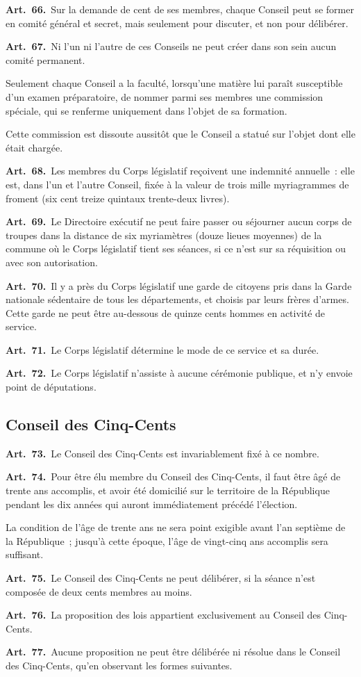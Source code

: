 \documentclass[french,twoside]{book} %
\newcommand{\labelchar}[1]{\textbf{\color{rubric} #1}}
\begin{document}
\labelchar{Art. 66.} Sur la demande de cent de ses membres, chaque Conseil peut se former en comité général et secret, mais seulement pour discuter, et non pour délibérer.\par
\labelchar{Art. 67.} Ni l’un ni l’autre de ces Conseils ne peut créer dans son sein aucun comité permanent.\par
Seulement chaque Conseil a la faculté, lorsqu’une matière lui paraît susceptible d’un examen préparatoire, de nommer parmi ses membres une commission spéciale, qui se renferme uniquement dans l’objet de sa formation.\par
Cette commission est dissoute aussitôt que le Conseil a statué sur l’objet dont elle était chargée.\par
\labelchar{Art. 68.} Les membres du Corps législatif reçoivent une indemnité annuelle : elle est, dans l’un et l’autre Conseil, fixée à la valeur de trois mille myriagrammes de froment (six cent treize quintaux trente-deux livres).\par
\labelchar{Art. 69.} Le Directoire exécutif ne peut faire passer ou séjourner aucun corps de troupes dans la distance de six myriamètres (douze lieues moyennes) de la commune où le Corps législatif tient ses séances, si ce n’est sur sa réquisition ou avec son autorisation.\par
\labelchar{Art. 70.} Il y a près du Corps législatif une garde de citoyens pris dans la Garde nationale sédentaire de tous les départements, et choisis par leurs frères d’armes. Cette garde ne peut être au-dessous de quinze cents hommes en activité de service.\par
\labelchar{Art. 71.} Le Corps législatif détermine le mode de ce service et sa durée.\par
\labelchar{Art. 72.} Le Corps législatif n’assiste à aucune cérémonie publique, et n’y envoie point de députations.

\subsection[{Conseil des Cinq-Cents}]{Conseil des Cinq-Cents}

\labelchar{Art. 73.} Le Conseil des Cinq-Cents est invariablement fixé à ce nombre.\par
\labelchar{Art. 74.} Pour être élu membre du Conseil des Cinq-Cents, il faut être âgé de trente ans accomplis, et avoir été domicilié sur le territoire de la République pendant les dix années qui auront immédiatement précédé l’élection.\par
La condition de l’âge de trente ans ne sera point exigible avant l’an septième de la République ; jusqu’à cette époque, l’âge de vingt-cinq ans accomplis sera suffisant.\par
\labelchar{Art. 75.} Le Conseil des Cinq-Cents ne peut délibérer, si la séance n’est composée de deux cents membres au moins.\par
\labelchar{Art. 76.} La proposition des lois appartient exclusivement au Conseil des Cinq-Cents.\par
\labelchar{Art. 77.} Aucune proposition ne peut être délibérée ni résolue dans le Conseil des Cinq-Cents, qu’en observant les formes suivantes.\par
\end{document}
